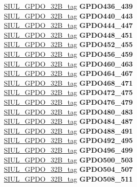 \begin{DoxyCompactItemize}
\begin{tabbing}
\>\>\mbox{\hyperlink{unionSIUL__GPDO__32B__tag}{SIUL\_GPDO\_32B\_tag}} {\bfseries GPDO436\_439}\\
\>\>\mbox{\hyperlink{unionSIUL__GPDO__32B__tag}{SIUL\_GPDO\_32B\_tag}} {\bfseries GPDO440\_443}\\
\>\>\mbox{\hyperlink{unionSIUL__GPDO__32B__tag}{SIUL\_GPDO\_32B\_tag}} {\bfseries GPDO444\_447}\\
\>\>\mbox{\hyperlink{unionSIUL__GPDO__32B__tag}{SIUL\_GPDO\_32B\_tag}} {\bfseries GPDO448\_451}\\
\>\>\mbox{\hyperlink{unionSIUL__GPDO__32B__tag}{SIUL\_GPDO\_32B\_tag}} {\bfseries GPDO452\_455}\\
\>\>\mbox{\hyperlink{unionSIUL__GPDO__32B__tag}{SIUL\_GPDO\_32B\_tag}} {\bfseries GPDO456\_459}\\
\>\>\mbox{\hyperlink{unionSIUL__GPDO__32B__tag}{SIUL\_GPDO\_32B\_tag}} {\bfseries GPDO460\_463}\\
\>\>\mbox{\hyperlink{unionSIUL__GPDO__32B__tag}{SIUL\_GPDO\_32B\_tag}} {\bfseries GPDO464\_467}\\
\>\>\mbox{\hyperlink{unionSIUL__GPDO__32B__tag}{SIUL\_GPDO\_32B\_tag}} {\bfseries GPDO468\_471}\\
\>\>\mbox{\hyperlink{unionSIUL__GPDO__32B__tag}{SIUL\_GPDO\_32B\_tag}} {\bfseries GPDO472\_475}\\
\>\>\mbox{\hyperlink{unionSIUL__GPDO__32B__tag}{SIUL\_GPDO\_32B\_tag}} {\bfseries GPDO476\_479}\\
\>\>\mbox{\hyperlink{unionSIUL__GPDO__32B__tag}{SIUL\_GPDO\_32B\_tag}} {\bfseries GPDO480\_483}\\
\>\>\mbox{\hyperlink{unionSIUL__GPDO__32B__tag}{SIUL\_GPDO\_32B\_tag}} {\bfseries GPDO484\_487}\\
\>\>\mbox{\hyperlink{unionSIUL__GPDO__32B__tag}{SIUL\_GPDO\_32B\_tag}} {\bfseries GPDO488\_491}\\
\>\>\mbox{\hyperlink{unionSIUL__GPDO__32B__tag}{SIUL\_GPDO\_32B\_tag}} {\bfseries GPDO492\_495}\\
\>\>\mbox{\hyperlink{unionSIUL__GPDO__32B__tag}{SIUL\_GPDO\_32B\_tag}} {\bfseries GPDO496\_499}\\
\>\>\mbox{\hyperlink{unionSIUL__GPDO__32B__tag}{SIUL\_GPDO\_32B\_tag}} {\bfseries GPDO500\_503}\\
\>\>\mbox{\hyperlink{unionSIUL__GPDO__32B__tag}{SIUL\_GPDO\_32B\_tag}} {\bfseries GPDO504\_507}\\
\>\>\mbox{\hyperlink{unionSIUL__GPDO__32B__tag}{SIUL\_GPDO\_32B\_tag}} {\bfseries GPDO508\_511}\\

\end{tabbing}
\end{DoxyCompactItemize}
